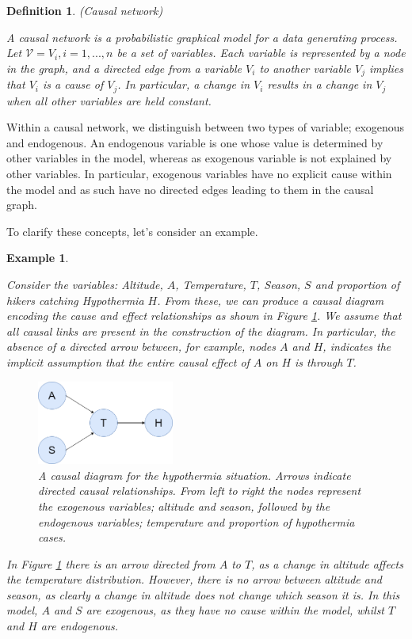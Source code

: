 \documentclass{article}
\newtheorem{defn}[theorem]{Definition}
\newtheorem{example}[theorem]{Example}
\begin{document}
\begin{defn}
 (Causal network) \cite{pearl2018book}

 \noindent A causal network is a probabilistic graphical model for a data generating process. Let $\mathcal{V} = {V_i, i = 1,...,n}$ be a set of variables. Each variable is represented by a node in the graph, and a directed edge from a variable $V_i$ to another variable $V_j$ implies that $V_i$ is a cause of $V_j$. In particular, a change in $V_i$ results in a change in $V_j$ when all other variables are held constant. 
\end{defn}

\noindent Within a causal network, we distinguish between two types of variable; exogenous and endogenous. An endogenous variable is one whose value is determined by other variables in the model, whereas as exogenous variable is not explained by other variables. In particular, exogenous variables have no explicit cause within the model and as such have no directed edges leading to them in the causal graph.

To clarify these concepts, let's consider an example.

\begin{example}
\label{ex:causal_diagram}
 
Consider the variables: Altitude, $A$, Temperature, $T$, Season, $S$ and proportion of hikers catching Hypothermia $H$. From these, we can produce a causal diagram encoding the cause and effect relationships as shown in Figure 
\ref{fig:hypothermia_diagram}. We assume that all causal links are present in the construction of the diagram. In particular, the absence of a directed arrow between, for example, nodes $A$ and $H$, indicates the implicit assumption that the entire causal effect of $A$ on $H$ is through $T$.
     
\begin{figure}[htp]
    \centering
    \includegraphics[width=0.4\textwidth]{Images/Causal example-Page-1.drawio.png}
    \caption{A causal diagram for the hypothermia situation. Arrows indicate directed causal relationships. From left to right the nodes represent the exogenous variables; altitude and season, followed by the endogenous variables; temperature and proportion of hypothermia cases. }
    \label{fig:hypothermia_diagram}
\end{figure}

\noindent In Figure \ref{fig:hypothermia_diagram} there is an arrow directed from $A$ to $T$, as a change in altitude affects the temperature distribution. However, there is no arrow between altitude and season, as clearly a change in altitude does not change which season it is. In this model, $A$ and $S$ are exogenous, as they have no cause within the model, whilst $T$ and $H$ are endogenous. 

\end{example}
\end{document}
